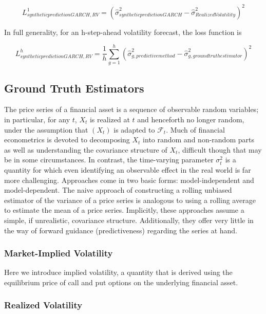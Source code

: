 \documentclass[11pt]{article}
\def\mc#1{\mathcal{#1}} %
\def\mc#1{\mathcal{#1}}
\theoremstyle{definition}
\begin{document}
$$ L^{1}_{synthetic prediction GARCH, RV} = (\hat\sigma^{2}_{synthetic prediction GARCH} - \hat\sigma^{2}_{Realized Volatility})^{2}$$

In full generality, for an h-step-ahead volatility forecast, the loss function is 

$$ L^{h}_{synthetic prediction GARCH, RV} = \frac{1}{h}\sum_{g=1}^{h}(\hat\sigma^{2}_{g, predictive method} - \hat\sigma^{2}_{g, ground truth estimator})^{2}$$



\subsection{Ground Truth Estimators}
\label{Ground Truth Estimators}

The price series of a financial asset is a sequence of observable random variables; in particular, for any $t$, $X_{t}$ is realized at $t$ and henceforth no longer random, under the assumption that $(X_{t})$ is adapted to $\mc{F}_{t}$.  Much of financial econometrics is devoted to decomposing $X_{t}$ into random and non-random parts as well as understanding the covariance structure of $X_{t}$, difficult though that may be in some circumstances.  In contrast, the time-varying parameter $\sigma^{2}_{t}$ is a quantity for which even identifying an observable effect in the real world is far more challenging.  Approaches come in two basic forms: model-independent and model-dependent.  The naive approach of constructing a rolling unbiased estimator of the variance of a price series is analogous to using a rolling average to estimate the mean of a price series.  Implicitly, these approaches assume a simple, if unrealistic, covariance structure.  Additionally, they offer very little in the way of forward guidance (predictiveness) regarding the series at hand.

\subsubsection{Market-Implied Volatility}

Here we introduce implied volatility, a quantity that is derived using the equilibrium price of call and put options on the underlying financial asset.

\subsubsection{Realized Volatility}
\end{document}
